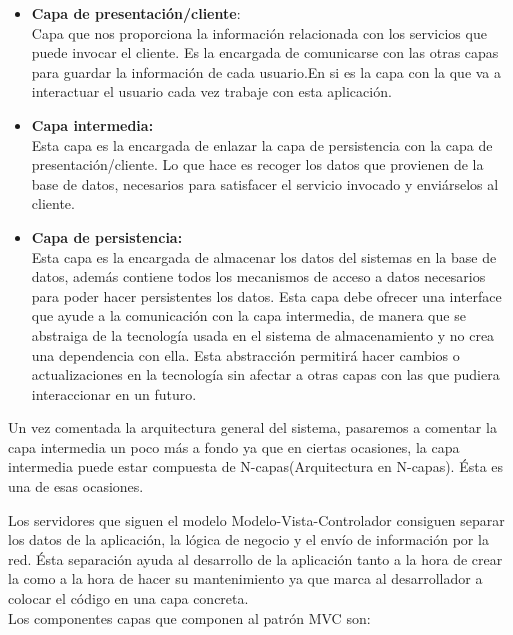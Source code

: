 \begin{itemize}
\item \textbf{Capa de presentación/cliente}:\\
Capa que  nos proporciona la información relacionada con los servicios que puede invocar el cliente. Es la encargada de comunicarse con las otras capas para guardar la información de cada usuario.En si es la capa con la que va a interactuar el usuario cada vez trabaje con esta aplicación.
\item \textbf{Capa intermedia:}\\
Esta capa es la encargada de enlazar la capa de persistencia con la capa de presentación/cliente. Lo que hace es recoger los datos que provienen de la base de datos, necesarios para satisfacer el servicio invocado y enviárselos al cliente.

\item \textbf{Capa de persistencia:}\\
Esta capa es la encargada de almacenar los datos del sistemas en la base de datos, además contiene todos los mecanismos de acceso a datos necesarios para poder hacer persistentes los datos.
 Esta capa debe ofrecer una interface que ayude a la comunicación con la capa intermedia, de manera que se abstraiga de la tecnología usada en el sistema de almacenamiento y no crea una dependencia con ella. Esta abstracción permitirá hacer cambios o actualizaciones en la tecnología sin afectar a otras capas con las que pudiera interaccionar en un futuro.\\
 


\end{itemize}
Un vez comentada la arquitectura general del sistema, pasaremos a comentar la capa intermedia un poco más a fondo ya que en ciertas ocasiones, la capa intermedia puede estar compuesta de N-capas(Arquitectura en N-capas). Ésta es una de esas ocasiones.

Los servidores que siguen el modelo Modelo-Vista-Controlador consiguen separar los datos de la  aplicación, la lógica de negocio  y el envío  de información por la red.
Ésta separación ayuda al desarrollo de la aplicación tanto a la hora de crear la como a la hora de hacer su mantenimiento ya que marca al desarrollador a colocar el código en una capa concreta. \\


Los componentes capas que componen al patrón MVC son:


